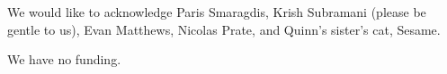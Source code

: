 \documentclass{article}
\begin{document}
\begin{ack}
    We would like to acknowledge Paris Smaragdis, Krish Subramani (please be gentle to us), Evan Matthews, Nicolas Prate, and Quinn’s sister’s cat, Sesame.

    We have no funding.
\end{ack}

















\end{document}
